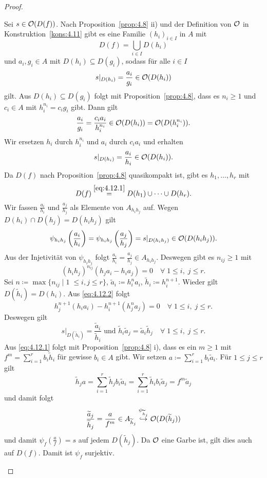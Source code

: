 \begin{prop}
\begin{proof}
\begin{enumerate}[i)]
			Sei $s \in \mathcal{O}(D(f))$. Nach Proposition~\ref{prop:4.8} ii) und der Definition von $\mathcal{O}$ in Konstruktion~\ref{kons:4.11} gibt es eine Familie $(h_i)_{i\in I}$ in $A$ mit
			\begin{equation*}
			\label{eq:4.12.1}
				D(f) = \bigcup_{i\in I} D(h_i) \tag{$\star$}
			\end{equation*}
			und $a_i,g_i \in A$ mit $D(h_i) \subseteq D(g_i)$, sodass für alle $i \in I$
			\[
				s\vert_{D(h_i)} = \frac{a_i}{g_i} \in \mathcal{O}(D(h_i))
			\]
			gilt. Aus $D(h_i) \subseteq D(g_i)$ folgt mit Proposition~\ref{prop:4.8}, dass es $n_i \ge 1$ und $c_i \in A$ mit $h_i^{n_i} = c_i g_i$ gibt. Dann gilt
			\[
				\frac{a_i}{g_i} = \frac{c_i a_i}{h_i^{n_i}} \in \mathcal{O}(D(h_i)) = \mathcal{O}(D(h_i^{n_i})).
			\]
			Wir ersetzen $h_i$ durch $h_i^{n_i}$ und $a_i$ durch $c_i a_i$ und erhalten
			\[
				s\vert_{D(h_i)} = \frac{a_i}{h_i} \in \mathcal{O}(D(h_i)).
			\]
			Da $D(f)$ nach Proposition~\ref{prop:4.8} quasikompakt ist, gibt es $h_1,\ldots,h_r$ mit
			\[
				D(f) \overset{\eqref{eq:4.12.1}}{=}  D(h_1)\cup \cdots \cup D(h_r).
			\]
			Wir fassen $\frac{a_i}{h_i}$ und $\frac{a_j}{h_j}$ als Elemente von $A_{h_ih_j}$ auf. Wegen $D(h_i)\cap D(h_j) = D(h_ih_j)$ gilt 
			\[
				\psi_{h_ih_j}\left(\frac{a_i}{h_i}\right) = \psi_{h_ih_j}\left(\frac{a_j}{h_j}\right) = s\vert_{D(h_ih_j)} \in \mathcal{O}(D(h_ih_j)).
			\]
			Aus der Injetivität von $\psi_{h_ih_j}$ folgt $\frac{a_i}{h_i} = \frac{a_j}{h_j} \in A_{h_ih_j}$. Deswegen gibt es $n_{ij}\ge 1$ mit
			\begin{equation*}
			\label{eq:4.12.2}
				(h_ih_j)^{n_{ij}}(h_ja_i-h_ia_j) = 0 \quad \forall \;1 \le i,\; j \le r. \tag{$\star\star$}
			\end{equation*}
			Sei $n \coloneqq \max\{n_{ij}\mid 1\; \le i, j \le r\}$, $\widetilde{a}_i\coloneqq h_i^na_i$, $\widetilde{h}_i \coloneqq h_i^{n+1}$. Wieder gilt $D(\widetilde{h}_i) = D(h_i)$. Aus \eqref{eq:4.12.2} folgt
			\[
				h_j^{n+1}(h_ia_i) - h_i^{n+1}(h_j^na_j) = 0 \quad \forall \;1 \le i,\; j\le r.
			\]
			Deswegen gilt
			\[
				s\vert_{D(\widetilde{h}_i)} = \frac{\widetilde{a}_i}{\widetilde{h}_i} \text{ und } \widetilde{h}_i\widetilde{a}_j = \widetilde{a}_i\widetilde{h}_j \quad \forall \;1 \leq i,\; j \le r.
			\]
			Aus \eqref{eq:4.12.1} folgt mit Proposition~\ref{prop:4.8} i), dass es ein $m \ge 1$ mit $f^m = \sum_{i=1}^r b_i \widetilde{h}_i$ für gewisse $b_i \in A$ gibt. Wir setzen $a \coloneqq \sum_{i=1}^r b_i \widetilde{a}_i$. Für $1 \le j \le r$ gilt
			\[
				\widetilde{h}_j a = \sum_{i=1}^r\widetilde{h}_jb_i\widetilde{a}_i = \sum_{i=1}^r\widetilde{h}_ib_i \widetilde{a}_j = f^m \widetilde{a}_j
			\]
			und damit folgt
			\[
				\frac{\widetilde{a}_j}{\widetilde{h}_j} = \frac{a}{f^m} \in A_{\widetilde{h}_j} \overset{\psi_{\widetilde{h}_j}}{\hookrightarrow} \mathcal{O}(D(\widetilde{h}_j))
			\]
			und damit $\psi_f\left(\frac{a}{f}\right) = s$ auf jedem $D(\widetilde{h}_j)$. Da $\mathcal{O}$ eine Garbe ist, gilt dies auch auf $D(f)$. Damit ist $\psi_f$ surjektiv.


\end{enumerate}
\end{proof}
\end{prop}
